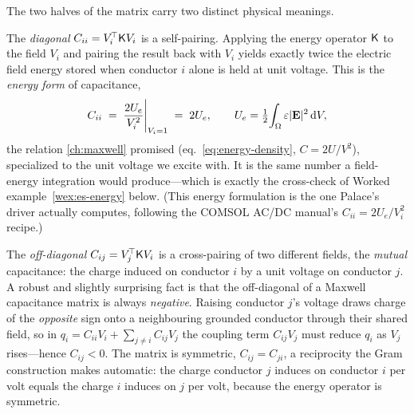 The two halves of the matrix carry two distinct physical meanings.

The \emph{diagonal} $C_{ii}=V_i^{\!\top}\mathsf{K} V_i$ is a self-pairing. Applying the
energy operator $\mathsf{K}$ to the field $V_i$ and pairing the result back with $V_i$
yields exactly twice the electric field energy stored when conductor $i$ alone is
held at unit voltage. This is the \emph{energy form} of capacitance,
\begin{equation}
  C_{ii} \;=\; \frac{2U_e}{V_i^2}\Bigg|_{V_i=1} \;=\; 2U_e ,
  \qquad U_e=\tfrac12\!\int_\Omega \varepsilon\lvert\mathbf{E}\rvert^2\,\mathrm{d}V ,
  \label{eq:cap-energy}
\end{equation}
the relation \cref{ch:maxwell} promised (eq.~\eqref{eq:energy-density}, $C=2U/V^2$),
specialized to the unit voltage we excite with. It is the same number a
field-energy integration would produce---which is exactly the cross-check of
Worked example~\ref{wex:es-energy} below. (This energy formulation is the one
Palace's driver actually computes, following the COMSOL AC/DC manual's
$C_{ii}=2U_e/V_i^2$ recipe.)

The \emph{off-diagonal} $C_{ij}=V_j^{\!\top}\mathsf{K} V_i$ is a cross-pairing of two
different fields, the \emph{mutual} capacitance: the charge induced on conductor
$i$ by a unit voltage on conductor $j$. A robust and slightly surprising fact is
that the off-diagonal of a Maxwell capacitance matrix is always \emph{negative}.
Raising conductor $j$'s voltage draws charge of the \emph{opposite} sign onto a
neighbouring grounded conductor through their shared field, so in
$q_i=C_{ii}V_i+\sum_{j\neq i}C_{ij}V_j$ the coupling term $C_{ij}V_j$ must reduce
$q_i$ as $V_j$ rises---hence $C_{ij}<0$. The matrix is symmetric, $C_{ij}=C_{ji}$,
a reciprocity the Gram construction makes automatic: the charge conductor $j$
induces on conductor $i$ per volt equals the charge $i$ induces on $j$ per volt,
because the energy operator is symmetric.


